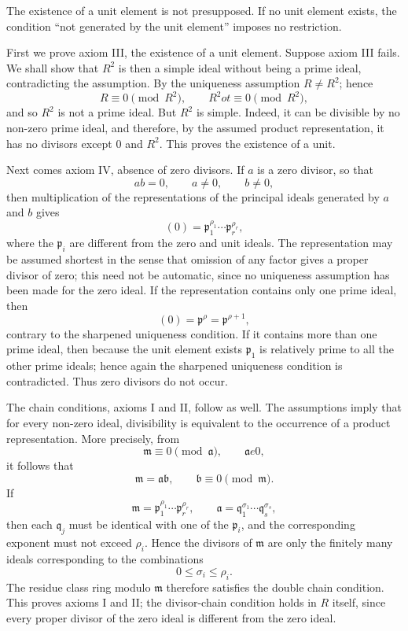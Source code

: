\documentclass[11pt]{article}
\begin{document}
The existence of a unit element is not presupposed. If no unit element
exists, the condition ``not generated by the unit element'' imposes no
restriction.

First we prove axiom III, the existence of a unit element. Suppose axiom
III fails. We shall show that \(R^2\) is then a simple ideal without
being a prime ideal, contradicting the assumption. By the uniqueness
assumption \(R\ne R^2\); hence \[
  R\equiv0\pmod{R^2},
  \qquad R^2
ot\equiv0\pmod{R^2},
\] and so \(R^2\) is not a prime ideal. But \(R^2\) is simple. Indeed,
it can be divisible by no non-zero prime ideal, and therefore, by the
assumed product representation, it has no divisors except \(0\) and
\(R^2\). This proves the existence of a unit.

Next comes axiom IV, absence of zero divisors. If \(a\) is a zero
divisor, so that \[
  ab=0,
  \qquad a\ne0,
  \qquad b\ne0,
\] then multiplication of the representations of the principal ideals
generated by \(a\) and \(b\) gives \[
  (0)=\mathfrak p_1^{\rho_1}\cdots\mathfrak p_r^{\rho_r},
\] where the \(\mathfrak p_i\) are different from the zero and unit
ideals. The representation may be assumed shortest in the sense that
omission of any factor gives a proper divisor of zero; this need not be
automatic, since no uniqueness assumption has been made for the zero
ideal. If the representation contains only one prime ideal, then \[
  (0)=\mathfrak p^{\rho}=\mathfrak p^{\rho+1},
\] contrary to the sharpened uniqueness condition. If it contains more
than one prime ideal, then because the unit element exists
\(\mathfrak p_1\) is relatively prime to all the other prime ideals;
hence again the sharpened uniqueness condition is contradicted. Thus
zero divisors do not occur.

The chain conditions, axioms I and II, follow as well. The assumptions
imply that for every non-zero ideal, divisibility is equivalent to the
occurrence of a product representation. More precisely, from \[
  \mathfrak m\equiv0\pmod{\mathfrak a},
  \qquad \mathfrak a
e0,
\] it follows that \[
  \mathfrak m=\mathfrak a\mathfrak b,
  \qquad \mathfrak b\equiv0\pmod{\mathfrak m}.
\] If \[
  \mathfrak m=\mathfrak p_1^{\rho_1}\cdots\mathfrak p_r^{\rho_r},
  \qquad \mathfrak a=\mathfrak q_1^{\sigma_1}\cdots\mathfrak q_s^{\sigma_s},
\] then each \(\mathfrak q_j\) must be identical with one of the
\(\mathfrak p_i\), and the corresponding exponent must not exceed
\(\rho_i\). Hence the divisors of \(\mathfrak m\) are only the finitely
many ideals corresponding to the combinations \[
  0\le \sigma_i\le \rho_i.
\] The residue class ring modulo \(\mathfrak m\) therefore satisfies the
double chain condition. This proves axioms I and II; the divisor-chain
condition holds in \(R\) itself, since every proper divisor of the zero
ideal is different from the zero ideal.
\end{document}
